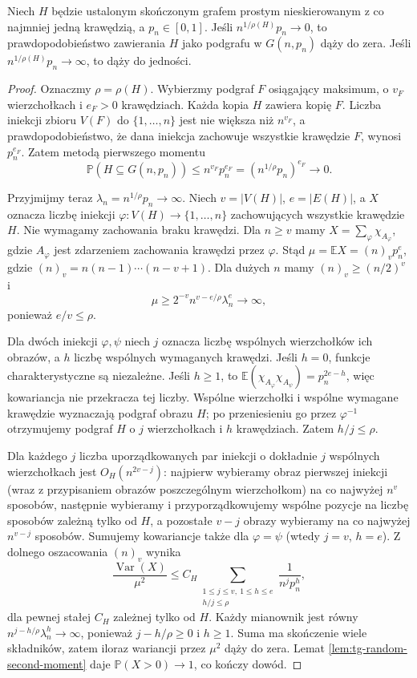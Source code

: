 \begin{twierdzenie}
\label{thm:tg-random-fixed-subgraph}
Niech $H$ będzie ustalonym skończonym grafem prostym
nieskierowanym z co najmniej jedną krawędzią,
a $p_n\in[0,1]$. Jeśli $n^{1/\rho(H)}p_n\to0$,
to prawdopodobieństwo zawierania $H$ jako podgrafu
w $G(n,p_n)$ dąży do zera. Jeśli
$n^{1/\rho(H)}p_n\to\infty$, to dąży do jedności.
\end{twierdzenie}
\begin{proof}
Oznaczmy $\rho=\rho(H)$. Wybierzmy podgraf $F$
osiągający maksimum, o $v_F$ wierzchołkach
i $e_F>0$ krawędziach. Każda kopia $H$ zawiera
kopię $F$. Liczba iniekcji zbioru $V(F)$ do
$\{1,\ldots,n\}$ jest nie większa niż $n^{v_F}$,
a prawdopodobieństwo, że dana iniekcja zachowuje
wszystkie krawędzie $F$, wynosi $p_n^{e_F}$.
Zatem metodą pierwszego momentu
\[
\mathbb P(H\subseteq G(n,p_n))
\leq n^{v_F}p_n^{e_F}
=(n^{1/\rho}p_n)^{e_F}\to0.
\]

Przyjmijmy teraz $\lambda_n=n^{1/\rho}p_n\to\infty$.
Niech $v=|V(H)|$, $e=|E(H)|$, a $X$ oznacza liczbę
iniekcji $\varphi:V(H)\to\{1,\ldots,n\}$ zachowujących
wszystkie krawędzie $H$. Nie wymagamy zachowania
braku krawędzi. Dla $n\geq v$ mamy
$X=\sum_\varphi\chi_{A_\varphi}$, gdzie $A_\varphi$
jest zdarzeniem zachowania krawędzi przez $\varphi$. Stąd $\mu=\mathbb EX=(n)_v p_n^e$,
gdzie $(n)_v=n(n-1)\cdots(n-v+1)$.
Dla dużych $n$ mamy $(n)_v\geq(n/2)^v$ i
\[
\mu\geq2^{-v}n^{v-e/\rho}\lambda_n^e\to\infty,
\]
ponieważ $e/v\leq\rho$.

Dla dwóch iniekcji $\varphi,\psi$ niech $j$
oznacza liczbę wspólnych wierzchołków ich obrazów,
a $h$ liczbę wspólnych wymaganych krawędzi.
Jeśli $h=0$, funkcje charakterystyczne są niezależne.
Jeśli $h\geq1$, to
$\mathbb E(\chi_{A_\varphi} \chi_{A_\psi})=p_n^{2e-h}$,
więc kowariancja nie przekracza tej liczby.
Wspólne wierzchołki i wspólne wymagane krawędzie
wyznaczają podgraf obrazu $H$; po przeniesieniu go
przez $\varphi^{-1}$ otrzymujemy podgraf $H$
o $j$ wierzchołkach i $h$ krawędziach.
Zatem $h/j\leq\rho$.

Dla każdego $j$ liczba uporządkowanych par iniekcji
o dokładnie $j$ wspólnych wierzchołkach jest
$O_H(n^{2v-j})$: najpierw wybieramy obraz pierwszej
iniekcji (wraz z przypisaniem obrazów poszczególnym wierzchołkom)
na co najwyżej $n^v$ sposobów, następnie
wybieramy i przyporządkowujemy wspólne pozycje na
liczbę sposobów zależną tylko od $H$, a pozostałe
$v-j$ obrazy wybieramy na co najwyżej $n^{v-j}$
sposobów. Sumujemy kowariancje także dla
$\varphi=\psi$ (wtedy $j=v$, $h=e$).
Z dolnego oszacowania $(n)_v$ wynika
\[
\frac{\operatorname{Var}(X)}{\mu^2}
\leq C_H
\sum_{\substack{1\leq j\leq v,\ 1\leq h\leq e\\h/j\leq\rho}}
\frac{1}{n^jp_n^h},
\]
dla pewnej stałej $C_H$ zależnej tylko od $H$.
Każdy mianownik jest równy
$n^{j-h/\rho}\lambda_n^h\to\infty$,
ponieważ $j-h/\rho\geq0$ i $h\geq1$.
Suma ma skończenie wiele składników, zatem
iloraz wariancji przez $\mu^2$ dąży do zera.
Lemat \ref{lem:tg-random-second-moment}
daje $\mathbb P(X>0)\to1$, co kończy dowód.
\end{proof}

